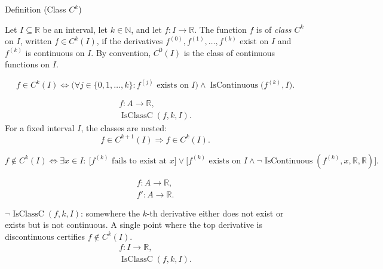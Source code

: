 \begin{definitionbox}{Definition (Class \(C^k\))}
\begin{definition}[Class \(C^k\)]
\label{def:class-ck}
Let \(I\subseteq\mathbb{R}\) be an interval, let \(k\in\mathbb{N}\), and let \(f:I\to\mathbb{R}\). The function \(f\) is of \emph{class \(C^k\)} on \(I\), written \(f\in C^k(I)\), if the derivatives \(f^{(0)},f^{(1)},\ldots,f^{(k)}\) exist on \(I\) and \(f^{(k)}\) is continuous on \(I\). By convention, \(C^0(I)\) is the class of continuous functions on \(I\).
\end{definition}
\end{definitionbox}

\begin{remark*}
\[
  f\in C^k(I)
  \Longleftrightarrow
  \bigl(\forall j\in\{0,1,\ldots,k\}: f^{(j)}\text{ exists on }I\bigr)
  \land
  \operatorname{IsContinuous}\bigl(f^{(k)},I\bigr).
\]
\end{remark*}

\begin{remark*}
\[
\begin{aligned}
  f\colon A\to\mathbb{R},\\
  \operatorname{IsClassC}(f,k,I).
\end{aligned}
\]
For a fixed interval \(I\), the classes are nested:
\[
  f\in C^{k+1}(I)\Longrightarrow f\in C^k(I).
\]
\end{remark*}

\begin{remark*}
\[
  f\notin C^k(I)
  \Longleftrightarrow
  \exists x\in I:\ \bigl[f^{(k)}\text{ fails to exist at }x\bigr]
  \vee
  \bigl[f^{(k)}\text{ exists on }I\land
  \neg\operatorname{IsContinuous}(f^{(k)},x,\mathbb{R},\mathbb{R})\bigr].
\]
\end{remark*}

\begin{remark*}
\[
\begin{aligned}
  f\colon A\to\mathbb{R},\\
  f'\colon A\to\mathbb{R}.
\end{aligned}
\]

\(\neg\operatorname{IsClassC}(f,k,I)\): somewhere the \(k\)-th derivative
either does not exist or exists but is not continuous. A single point where
the top derivative is discontinuous certifies \(f\notin C^k(I)\).
\[
\begin{aligned}
  f\colon I\to\mathbb{R},\\
  \operatorname{IsClassC}(f,k,I).
\end{aligned}
\]
\end{remark*}

